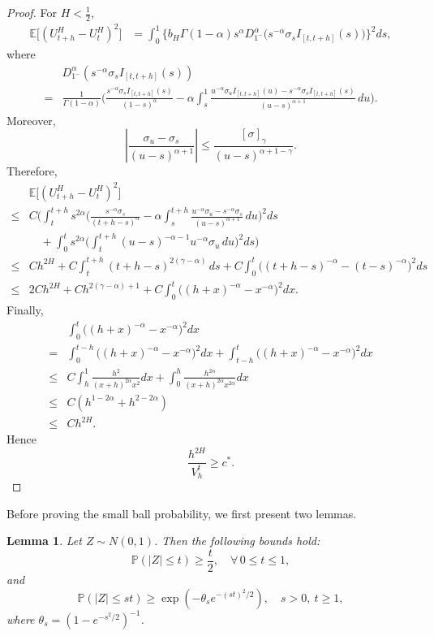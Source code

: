 \documentclass[preprint,12pt]{elsarticle}
\newtheorem{lemma}[theorem]{Lemma}
\theoremstyle{definition}  %
\theoremstyle{plain}  %
\begin{document}
\begin{proof}
For $H < \tfrac{1}{2}$,
\begin{align*}
	\mathbb{E}\big[(U_{t+h}^H-U_t^H)^2\big]
	&= \int_0^1 \big\{b_H\Gamma(1-\alpha)s^\alpha D^\alpha_{1^-}\!\big(s^{-\alpha}\sigma_s I_{[t,t+h]}(s)\big)\big\}^2 ds,
\end{align*}
where
\begin{align*}
	&D^\alpha_{1^-}(s^{-\alpha}\sigma_s I_{[t,t+h]}(s))\\
	=& \frac{1}{\Gamma(1-\alpha)}\Bigg(
	\frac{s^{-\alpha}\sigma_s I_{[t,t+h]}(s)}{(1-s)^\alpha}
	- \alpha\int_s^1 \frac{u^{-\alpha}\sigma_u I_{[t,t+h]}(u)-s^{-\alpha}\sigma_s I_{[t,t+h]}(s)}{(u-s)^{\alpha+1}}\,du
	\Bigg).
\end{align*}
Moreover,
\[
	\left|\frac{\sigma_u-\sigma_s}{(u-s)^{\alpha+1}}\right|
	\leq \frac{[\sigma]_\gamma}{(u-s)^{\alpha+1-\gamma}}.
\]
Therefore,
\begin{align*}
	&\mathbb{E}\big[(U_{t+h}^H-U_t^H)^2\big]\\
	\leq & C\Bigg(
	\int_t^{t+h} s^{2\alpha}\Bigg(\frac{s^{-\alpha}\sigma_s}{(t+h-s)^\alpha}
	- \alpha\int_s^{t+h}\frac{u^{-\alpha}\sigma_u-s^{-\alpha}\sigma_s}{(u-s)^{\alpha+1}}\,du\Bigg)^2 ds \\
	&\quad + \int_0^t s^{2\alpha}\Bigg(\int_t^{t+h}(u-s)^{-\alpha-1}u^{-\alpha}\sigma_u\,du\Bigg)^2 ds
	\Bigg) \\
	\leq & Ch^{2H}
	+ C\int_t^{t+h}(t+h-s)^{2(\gamma-\alpha)}\,ds
	+ C\int_0^t\big((t+h-s)^{-\alpha}-(t-s)^{-\alpha}\big)^2 ds \\
	\leq & 2Ch^{2H} + C h^{2(\gamma-\alpha)+1}
	+ C\int_0^t\big((h+x)^{-\alpha}-x^{-\alpha}\big)^2 dx.
\end{align*}
Finally,
\begin{align*}
	&\int_0^t \big((h+x)^{-\alpha}-x^{-\alpha}\big)^2 dx \\
	=& \int_0^{t-h}\big((h+x)^{-\alpha}-x^{-\alpha}\big)^2 dx
	+ \int_{t-h}^t \big((h+x)^{-\alpha}-x^{-\alpha}\big)^2 dx \\
	\leq & C\int_h^1 \frac{h^2}{(x+h)^{2\alpha}x^2} dx
	+ \int_0^h \frac{h^{2\alpha}}{(x+h)^{2\alpha}x^{2\alpha}} dx \\
	\leq & C(h^{1-2\alpha}+h^{2-2\alpha}) \\
	\leq & Ch^{2H}.
\end{align*}
Hence
\[
	\frac{h^{2H}}{V_h^t} \geq c^*.
\]
\end{proof}

	
	
	
	
	
    Before proving the small ball probability, we first present two lemmas.
	\begin{lemma}
Let $Z \sim N(0,1)$. Then the following bounds hold:
\begin{equation}
    \mathbb{P}(|Z| \le t) \ge \frac{t}{2}, \quad \forall\, 0 \le t \le 1,  \label{smpexp1}
\end{equation}
and
\begin{equation}
    \mathbb{P}(|Z| \le st) \ge \exp\!\left( -\theta_s e^{-(st)^2/2} \right), 
    \quad s > 0,\ t \ge 1,\label{smpexp2}
\end{equation}
where $\theta_s = \left( 1 - e^{-s^2/2} \right)^{-1}$.
\end{lemma}
\end{document}

